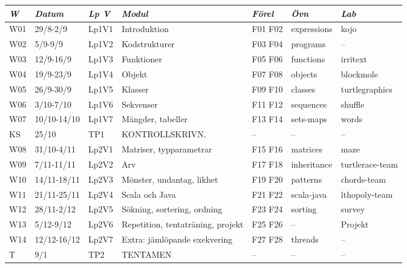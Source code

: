 \begin{tabular}{l|l|l|l|l|l|l}
\textit{W} & \textit{Datum} & \textit{Lp V} & \textit{Modul} & \textit{Förel} & \textit{Övn} & \textit{Lab} \\ \hline \hline
W01 & 29/8-2/9 & Lp1V1 & Introduktion & F01 F02 & expressions & kojo \\
W02 & 5/9-9/9 & Lp1V2 & Kodstrukturer & F03 F04 & programs & -- \\
W03 & 12/9-16/9 & Lp1V3 & Funktioner & F05 F06 & functions & irritext \\
W04 & 19/9-23/9 & Lp1V4 & Objekt & F07 F08 & objects & blockmole \\
W05 & 26/9-30/9 & Lp1V5 & Klasser & F09 F10 & classes & turtlegraphics \\
W06 & 3/10-7/10 & Lp1V6 & Sekvenser & F11 F12 & sequences & shuffle \\
W07 & 10/10-14/10 & Lp1V7 & Mängder, tabeller & F13 F14 & sets-maps & words \\
KS & 25/10 & TP1 & KONTROLLSKRIVN. & -- & -- & -- \\
W08 & 31/10-4/11 & Lp2V1 & Matriser, typparametrar & F15 F16 & matrices & maze \\
W09 & 7/11-11/11 & Lp2V2 & Arv & F17 F18 & inheritance & turtlerace-team \\
W10 & 14/11-18/11 & Lp2V3 & Mönster, undantag, likhet & F19 F20 & patterns & chords-team \\
W11 & 21/11-25/11 & Lp2V4 & Scala och Java & F21 F22 & scala-java & lthopoly-team \\
W12 & 28/11-2/12 & Lp2V5 & Sökning, sortering, ordning & F23 F24 & sorting & survey \\
W13 & 5/12-9/12 & Lp2V6 & Repetition, tentaträning, projekt & F25 F26 & -- & Projekt \\
W14 & 12/12-16/12 & Lp2V7 & Extra: jämlöpande exekvering & F27 F28 & threads & -- \\
T & 9/1 & TP2 & TENTAMEN & -- & -- & -- \\
\end{tabular}
